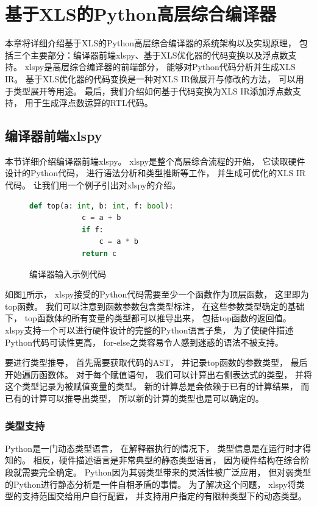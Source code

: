 \section{基于XLS的Python高层综合编译器}

本章将详细介绍基于XLS的Python高层综合编译器的系统架构以及实现原理，
包括三个主要部分：编译器前端xlspy、基于XLS优化器的代码变换以及浮点数支持。
xlspy是高层综合编译器的前端部分，
能够对Python代码分析并生成XLS IR。
基于XLS优化器的代码变换是一种对XLS IR做展开与修改的方法，
可以用于类型展开等用途。
最后，我们介绍如何基于代码变换为XLS IR添加浮点数支持，
用于生成浮点数运算的RTL代码。

\subsection{编译器前端xlspy}

本节详细介绍编译器前端xlspy。
xlspy是整个高层综合流程的开始，
它读取硬件设计的Python代码，
进行语法分析和类型推断等工作，
并生成可优化的XLS IR代码。
让我们用一个例子引出对xlspy的介绍。

\begin{figure}[h]
    \begin{lstlisting}[language=Python,frame=single]
        def top(a: int, b: int, f: bool):
            c = a + b
            if f:
                c = a * b
            return c
    \end{lstlisting}
    \caption{编译器输入示例代码}
    \label{code.1}
\end{figure}

如图\ref{code.1}所示，
xlspy接受的Python代码需要至少一个函数作为顶层函数，
这里即为top函数。
我们可以注意到函数参数包含类型标注，
在这些参数类型确定的基础下，
top函数体的所有变量的类型都可以推导出来，
包括top函数的返回值。
xlspy支持一个可以进行硬件设计的完整的Python语言子集，
为了使硬件描述Python代码可读性更高，
for-else之类容易令人感到迷惑的语法不被支持。

要进行类型推导，
首先需要获取代码的AST，
并记录top函数的参数类型，
最后开始遍历函数体。
对于每个赋值语句，
我们可以计算出右侧表达式的类型，
并将这个类型记录为被赋值变量的类型。
新的计算总是会依赖于已有的计算结果，
而已有的计算可以推导出类型，
所以新的计算的类型也是可以确定的。

\subsubsection{类型支持}

Python是一门动态类型语言，
在解释器执行的情况下，
类型信息是在运行时才得知的。
相反，硬件描述语言是非常典型的静态类型语言，
因为硬件结构在综合阶段就需要完全确定。
Python因为其弱类型带来的灵活性被广泛应用，
但对弱类型的Python进行静态分析是一件自相矛盾的事情。
为了解决这个问题，
xlspy将类型的支持范围交给用户自行配置，
并支持用户指定的有限种类型下的动态类型。

